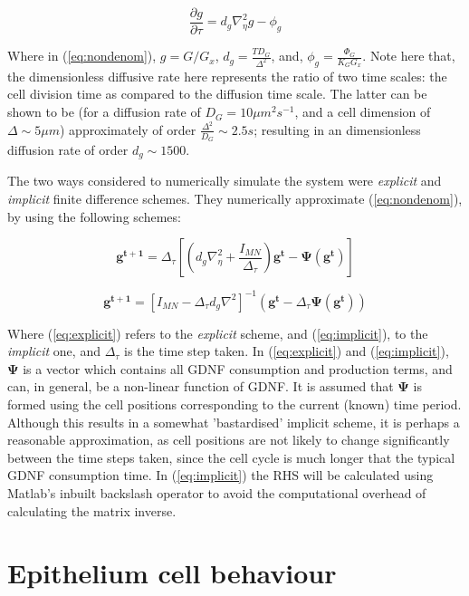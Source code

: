 \documentclass[pdftex,10pt,a4paper]{article}
\begin{document}
\begin{equation}\label{eq:nondenom}
\frac{\partial g}{\partial \tau} = d_g \nabla_\eta^2 g - \phi_g
\end{equation}

Where in (\ref{eq:nondenom}), $g = G/G_x$, $d_g = \frac{T D_G}{\Delta^2}$, and, $\phi_g = \frac{\Phi_G}{K_G G_x}$. Note here that, the dimensionless diffusive rate here represents the ratio of two time scales: the cell division time as compared to the diffusion time scale. The latter can be shown to be (for a diffusion rate of $D_G = 10 \mu m^2 s^{-1}$, and a cell dimension of $\Delta \sim 5 \mu m$) approximately of order $\frac{\Delta^2}{D_G} \sim 2.5 s$; resulting in an dimensionless diffusion rate of order $d_g \sim 1500 $.

The two ways considered to numerically simulate the system were \emph{explicit} and \emph{implicit} finite difference schemes. They numerically approximate (\ref{eq:nondenom}), by using the following schemes:

\begin{equation}\label{eq:explicit}
\mathbf{g^{t+1}} = \Delta_\tau [(d_g \nabla_\eta^2 + \frac{I_{MN}}{\Delta_\tau})\mathbf{g^t} - \mathbf{\Psi}(\mathbf{g^t})]
\end{equation}

\begin{equation}\label{eq:implicit}
\mathbf{g^{t+1}} = [I_{MN} - \Delta_\tau d_g \nabla^2]^{-1}(\mathbf{g^t} - \Delta_\tau \mathbf{\Psi}(\mathbf{g^t}))
\end{equation}

Where (\ref{eq:explicit}) refers to the \emph{explicit} scheme, and (\ref{eq:implicit}), to the \emph{implicit} one, and $\Delta_\tau$ is the time step taken. In (\ref{eq:explicit}) and (\ref{eq:implicit}), $\mathbf{\Psi}$ is a vector which contains all GDNF consumption and production terms, and can, in general, be a non-linear function of GDNF. It is assumed that $\mathbf{\Psi}$ is formed using the cell positions corresponding to the current (known) time period. Although this results in a somewhat 'bastardised' implicit scheme, it is perhaps a reasonable approximation, as cell positions are not likely to change significantly between the time steps taken, since the cell cycle is much longer that the typical GDNF consumption time. In (\ref{eq:implicit}) the RHS will be calculated using Matlab's inbuilt backslash operator to avoid the computational overhead of calculating the matrix inverse.

\section{Epithelium cell behaviour}
\end{document}
